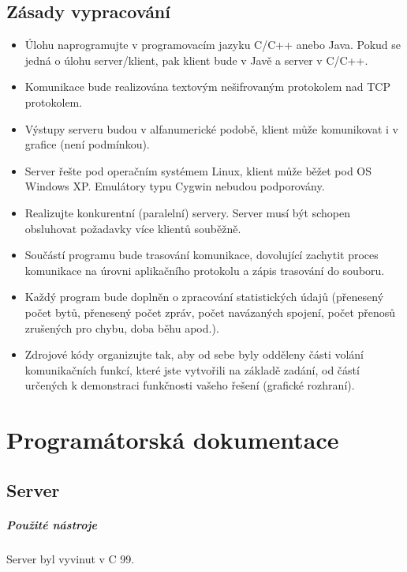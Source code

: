 \documentclass[12pt, a4paper]{report}
\begin{document}
\section{Zásady vypracování}
\begin{itemize}
	\item Úlohu naprogramujte v programovacím jazyku C/C++ anebo Java. Pokud se jedná o úlohu server/klient, pak klient bude v Javě a server v C/C++.
	\item Komunikace bude realizována textovým nešifrovaným protokolem nad TCP protokolem.
	\item Výstupy serveru budou v alfanumerické podobě, klient může komunikovat i v grafice (není podmínkou).
	\item Server řešte pod operačním systémem Linux, klient může běžet pod OS Windows XP. Emulátory typu Cygwin nebudou podporovány.
	\item Realizujte konkurentní (paralelní) servery. Server musí být schopen obsluhovat požadavky více klientů souběžně.
	\item Součástí programu bude trasování komunikace, dovolující zachytit proces komunikace na úrovni aplikačního protokolu a zápis trasování do souboru.
	\item Každý program bude doplněn o zpracování statistických údajů (přenesený počet bytů, přenesený počet zpráv, počet navázaných spojení, počet přenosů zrušených pro chybu, doba běhu apod.).
	\item Zdrojové kódy organizujte tak, aby od sebe byly odděleny části volání komunikačních funkcí, které jste vytvořili na základě zadání, od částí určených k demonstraci funkčnosti vašeho řešení (grafické rozhraní).
\end{itemize}

\chapter{Programátorská dokumentace}
\section{Server}

\paragraph{Použité nástroje}
 Server byl vyvinut v C 99.
\end{document}
